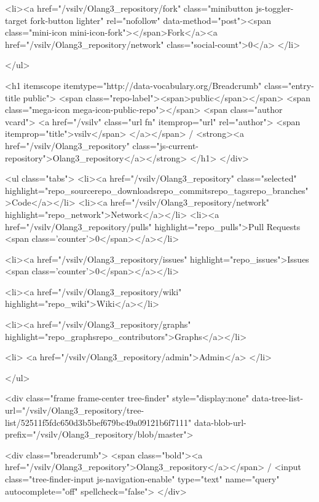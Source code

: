               <li><a href="/vsilv/Olang3_repository/fork" class="minibutton js-toggler-target fork-button lighter" rel="nofollow" data-method="post"><span class="mini-icon mini-icon-fork"></span>Fork</a><a href="/vsilv/Olang3_repository/network" class="social-count">0</a>
              </li>


    </ul>

              <h1 itemscope itemtype="http://data-vocabulary.org/Breadcrumb" class="entry-title public">
                <span class="repo-label"><span>public</span></span>
                <span class="mega-icon mega-icon-public-repo"></span>
                <span class="author vcard">
                  <a href="/vsilv" class="url fn" itemprop="url" rel="author">
                  <span itemprop="title">vsilv</span>
                  </a></span> /
                <strong><a href="/vsilv/Olang3_repository" class="js-current-repository">Olang3_repository</a></strong>
              </h1>
            </div>

            

  <ul class="tabs">
    <li><a href="/vsilv/Olang3_repository" class="selected" highlight="repo_sourcerepo_downloadsrepo_commitsrepo_tagsrepo_branches">Code</a></li>
    <li><a href="/vsilv/Olang3_repository/network" highlight="repo_network">Network</a></li>
    <li><a href="/vsilv/Olang3_repository/pulls" highlight="repo_pulls">Pull Requests <span class='counter'>0</span></a></li>

      <li><a href="/vsilv/Olang3_repository/issues" highlight="repo_issues">Issues <span class='counter'>0</span></a></li>

      <li><a href="/vsilv/Olang3_repository/wiki" highlight="repo_wiki">Wiki</a></li>


    <li><a href="/vsilv/Olang3_repository/graphs" highlight="repo_graphsrepo_contributors">Graphs</a></li>

      <li>
        <a href="/vsilv/Olang3_repository/admin">Admin</a>
      </li>

  </ul>
  
  <div class="frame frame-center tree-finder" style="display:none"
      data-tree-list-url="/vsilv/Olang3_repository/tree-list/52511f5fdc650d3b5bef679bc49a09121b6f7111"
      data-blob-url-prefix="/vsilv/Olang3_repository/blob/master">

  <div class="breadcrumb">
    <span class="bold"><a href="/vsilv/Olang3_repository">Olang3_repository</a></span> /
    <input class="tree-finder-input js-navigation-enable" type="text" name="query" autocomplete="off" spellcheck="false">
  </div>

